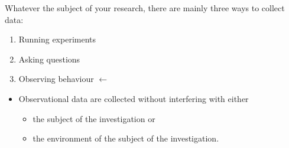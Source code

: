 \documentclass[serif, aspectratio=169]{beamer}
\begin{document}
\begin{frame}

Whatever the subject of your research, there are mainly three ways to collect data: 

\begin{enumerate}

\item<1-> Running experiments

\item<2-> Asking questions

\item<3-> Observing behaviour $\leftarrow$

\end{enumerate}

\begin{itemize}
\item <4-> Observational data are collected without interfering with either
\begin{itemize}
\item<4-> the subject of the investigation or 
\item<4-> the environment of the subject of the investigation.
\end{itemize}
\end{itemize}

\end{frame}
\end{document}
